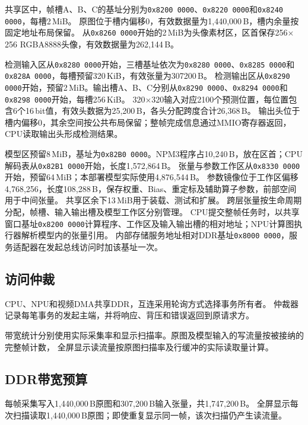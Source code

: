 共享区中，帧槽A、B、C的基址分别为\texttt{0x8200\,0000}、\texttt{0x8220\,0000}和\texttt{0x8240\,0000}，每槽2\,MiB。
原图位于槽内偏移0，有效数据量为1,440,000\,B，槽内余量按固定地址布局保留。
从\texttt{0x8260\,0000}开始的2\,MiB为头像素材区，区首保存256$\times$256 RGBA8888头像，有效数据量为262,144\,B。

检测输入区从\texttt{0x8280\,0000}开始，三槽基址依次为\texttt{0x8280\,0000}、\texttt{0x8285\,0000}和\texttt{0x828A\,0000}，每槽预留320\,KiB，有效张量为307200\,B。
检测输出区从\texttt{0x8290\,0000}开始，预留2\,MiB。输出槽A、B、C分别从\texttt{0x8290\,0000}、\texttt{0x8294\,0000}和\texttt{0x8298\,0000}开始，每槽256\,KiB。
320$\times$320输入对应2100个预测位置，每位置包含6个16\,bit值，有效头数据为25,200\,B，各头分配跨度合计26,368\,B。
输出头位于槽内偏移0，其余空间按公共布局保留；整帧完成信息通过MMIO寄存器返回，CPU读取输出头形成检测结果。

模型区预留8\,MiB，基址为\texttt{0x82B0\,0000}。NPM3程序占10,240\,B，放在区首；CPU解码表从\texttt{0x82B1\,0000}开始，长度1,572,864\,B。
张量与参数工作区从\texttt{0x8330\,0000}开始，预留64\,MiB；本部署模型实际使用4,876,544\,B。
参数镜像位于工作区偏移4,768,256，长度108,288\,B，保存权重、Bias、重定标及辅助算子参数，前部空间用于中间张量。
共享区余下13\,MiB用于装载、测试和扩展。
跨层张量按生命周期分配，帧槽、输入输出槽及模型工作区分别管理。
CPU提交整帧任务时，以共享窗口基址\texttt{0x8200\,0000}计算程序、工作区及输入输出槽的相对地址；NPU计算图执行器解析模型内的张量引用。
内部存储服务地址相对DDR基址\texttt{0x8000\,0000}，服务适配器在发起总线访问时加该基址一次。

\subsection{访问仲裁}

CPU、NPU和视频DMA共享DDR，互连采用轮询方式选择事务所有者。
仲裁器记录每笔事务的发起主端，并将响应、背压和错误返回到原请求方。

带宽统计分别使用实际采集率和显示扫描率。原图及模型输入的写流量按被接纳的完整帧计数，
全屏显示读流量按原图扫描率及行缓冲的实际读取量计算。

\subsection{DDR带宽预算}

每帧采集写入1,440,000\,B原图和307,200\,B输入张量，共1,747,200\,B。
全屏显示每次扫描读取1,440,000\,B原图；即使重复显示同一帧，该次扫描仍产生读流量。

